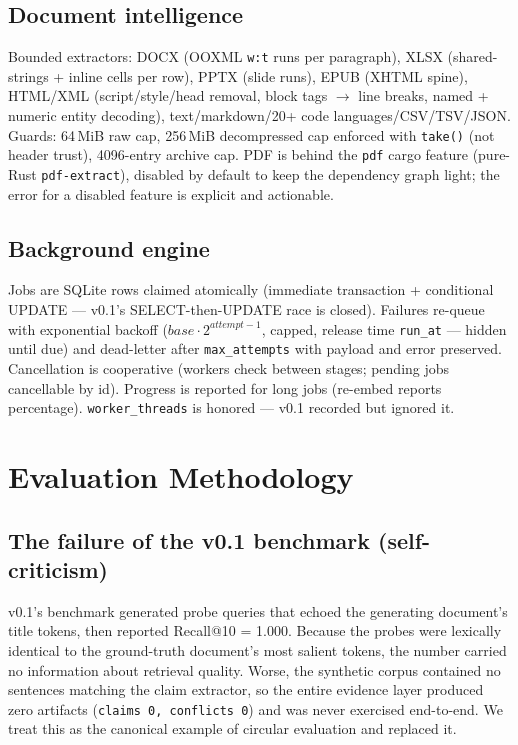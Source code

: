 \subsection{Document intelligence}\label{sec:documents}

Bounded extractors: DOCX (OOXML \texttt{w:t} runs per paragraph), XLSX
(shared-strings + inline cells per row), PPTX (slide runs), EPUB (XHTML
spine), HTML/XML (script/style/head removal, block tags $\rightarrow$ line
breaks, named + numeric entity decoding), text/markdown/20+ code
languages/CSV/TSV/JSON. Guards: 64\,MiB raw cap, 256\,MiB decompressed cap
enforced with \texttt{take()} (not header trust), 4096-entry archive cap. PDF
is behind the \texttt{pdf} cargo feature (pure-Rust \texttt{pdf-extract}),
disabled by default to keep the dependency graph light; the error for a
disabled feature is explicit and actionable.

\subsection{Background engine}\label{sec:jobs}

Jobs are SQLite rows claimed atomically (immediate transaction + conditional
UPDATE --- v0.1's SELECT-then-UPDATE race is closed). Failures re-queue with
exponential backoff ($\mathit{base}\cdot 2^{\mathit{attempt}-1}$, capped,
release time \texttt{run\_at} --- hidden until due) and dead-letter after
\texttt{max\_attempts} with payload and error preserved. Cancellation is
cooperative (workers check between stages; pending jobs cancellable by id).
Progress is reported for long jobs (re-embed reports percentage).
\texttt{worker\_threads} is honored --- v0.1 recorded but ignored it.

\needspace{0.2\textheight}
\section{Evaluation Methodology}\label{sec:methodology}

\subsection{The failure of the v0.1 benchmark (self-criticism)}\label{sec:v1-failure}

v0.1's benchmark generated probe queries that echoed the generating
document's title tokens, then reported Recall@10 = 1.000. Because the probes
were lexically identical to the ground-truth document's most salient tokens,
the number carried no information about retrieval quality. Worse, the
synthetic corpus contained no sentences matching the claim extractor, so the
entire evidence layer produced zero artifacts (\texttt{claims 0,
conflicts 0}) and was never exercised end-to-end. We treat this as the
canonical example of circular evaluation and replaced it.

